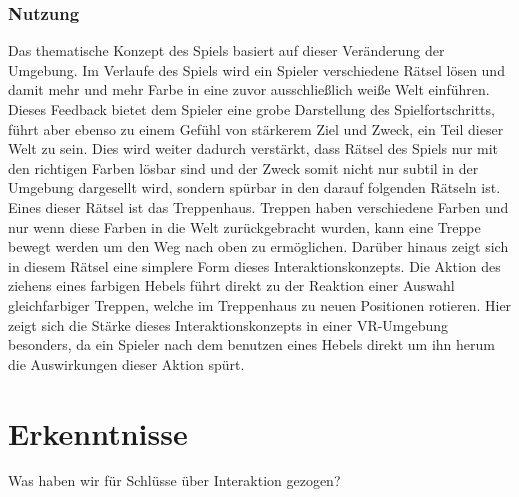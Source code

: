 \subsubsection{Nutzung}
Das thematische Konzept des Spiels basiert auf dieser Veränderung der Umgebung. Im Verlaufe des Spiels wird ein Spieler verschiedene Rätsel lösen und damit mehr und mehr Farbe in eine zuvor ausschließlich weiße Welt einführen. Dieses Feedback bietet dem Spieler eine grobe Darstellung des Spielfortschritts, führt aber ebenso zu einem Gefühl von stärkerem Ziel und Zweck, ein Teil dieser Welt zu sein. Dies wird weiter dadurch verstärkt, dass Rätsel des Spiels nur mit den richtigen Farben lösbar sind und der Zweck somit nicht nur subtil in der Umgebung dargesellt wird, sondern spürbar in den darauf folgenden Rätseln ist.\\

Eines dieser Rätsel ist das Treppenhaus. Treppen haben verschiedene Farben und nur wenn diese Farben in die Welt zurückgebracht wurden, kann eine Treppe bewegt werden um den Weg nach oben zu ermöglichen. Darüber hinaus zeigt sich in diesem Rätsel eine simplere Form dieses Interaktionskonzepts. Die Aktion des ziehens eines farbigen Hebels führt direkt zu der Reaktion einer Auswahl gleichfarbiger Treppen, welche im Treppenhaus zu neuen Positionen rotieren. Hier zeigt sich die Stärke dieses Interaktionskonzepts in einer VR-Umgebung besonders, da ein Spieler nach dem benutzen eines Hebels direkt um ihn herum die Auswirkungen dieser Aktion spürt.


\section{Erkenntnisse}
Was haben wir für Schlüsse über Interaktion gezogen? 